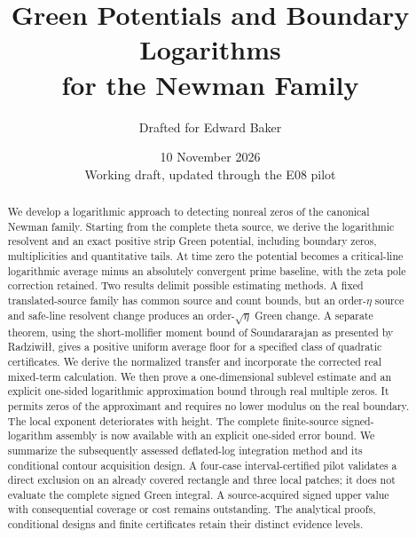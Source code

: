 \documentclass[11pt]{article}
\title{Green Potentials and Boundary Logarithms\\for the Newman Family}
\author{Drafted for Edward Baker}
\date{10 November 2026\\\small Working draft, updated through the E08 pilot}
\theoremstyle{definition}
\theoremstyle{remark}
\numberwithin{equation}{section}
\begin{document}
\maketitle
\begin{abstract}
We develop a logarithmic approach to detecting nonreal zeros of the
canonical Newman family. Starting from the complete theta source, we
derive the logarithmic resolvent and an exact positive strip Green
potential, including boundary zeros, multiplicities and quantitative
tails. At time zero the potential becomes a critical-line logarithmic
average minus an absolutely convergent prime baseline, with the zeta
pole correction retained. Two results delimit possible estimating
methods. A fixed translated-source family has common source and count
bounds, but an order-\(\eta\) source and safe-line resolvent change
produces an order-\(\sqrt\eta\) Green change. A separate theorem,
using the short-mollifier moment bound of Soundararajan as presented
by Radziwi{\l}{\l}, gives a positive uniform average floor for a
specified class of quadratic certificates. We derive the normalized
transfer and incorporate the corrected real mixed-term calculation.
We then prove a one-dimensional sublevel estimate and an explicit
one-sided logarithmic approximation bound through real multiple zeros.
It permits zeros of the approximant and requires no lower modulus on
the real boundary. The local exponent deteriorates with height.
The complete finite-source signed-logarithm assembly is now available
with an explicit one-sided error bound. We summarize the subsequently
assessed deflated-log integration method and its conditional contour
acquisition design. A four-case interval-certified pilot validates a
direct exclusion on an already covered rectangle and three local
patches; it does not evaluate the complete signed Green integral.
A source-acquired signed upper value with consequential coverage or
cost remains outstanding. The analytical proofs, conditional designs
and finite certificates retain their distinct evidence levels.
\end{abstract}
\clearpage
\tableofcontents
\clearpage









\begingroup\footnotesize\raggedright


\endgroup
\end{document}
